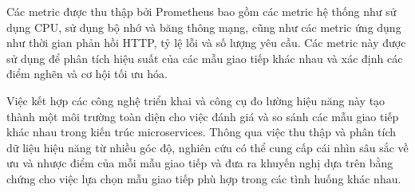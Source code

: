 Các metric được thu thập bởi Prometheus bao gồm các metric hệ thống như sử dụng CPU, sử dụng bộ nhớ và băng thông mạng, cũng như các metric ứng dụng như thời gian phản hồi HTTP, tỷ lệ lỗi và số lượng yêu cầu. Các metric này được sử dụng để phân tích hiệu suất của các mẫu giao tiếp khác nhau và xác định các điểm nghẽn và cơ hội tối ưu hóa.

Việc kết hợp các công nghệ triển khai và công cụ đo lường hiệu năng này tạo thành một môi trường toàn diện cho việc đánh giá và so sánh các mẫu giao tiếp khác nhau trong kiến trúc microservices. Thông qua việc thu thập và phân tích dữ liệu hiệu năng từ nhiều góc độ, nghiên cứu có thể cung cấp cái nhìn sâu sắc về ưu và nhược điểm của mỗi mẫu giao tiếp và đưa ra khuyến nghị dựa trên bằng chứng cho việc lựa chọn mẫu giao tiếp phù hợp trong các tình huống khác nhau.